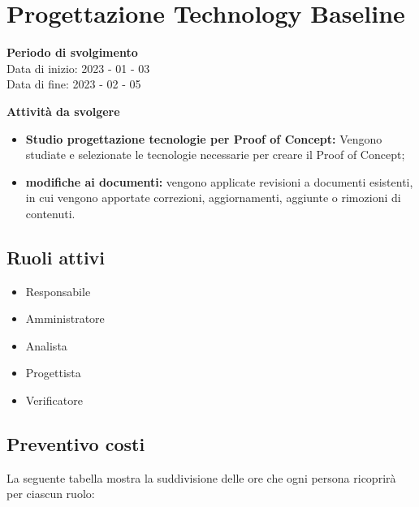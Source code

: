 \section{Progettazione Technology Baseline}

\textbf{Periodo di svolgimento}
\\ Data di inizio: 2023 - 01 - 03 \\ Data di fine: 2023 - 02 - 05

\textbf{Attività da svolgere}
    \begin{itemize}
        \item \textbf{Studio progettazione tecnologie per Proof of Concept:} Vengono studiate e selezionate le tecnologie necessarie per creare il Proof of Concept; 
        \item \textbf{modifiche ai documenti:} vengono applicate revisioni a documenti esistenti, in cui vengono apportate correzioni, aggiornamenti, aggiunte o rimozioni di contenuti.
    \end{itemize}

\subsection{Ruoli attivi}
\begin{itemize}
    \item Responsabile
    \item Amministratore 
    \item Analista 
    \item Progettista 
    \item Verificatore 
\end{itemize}

\subsection{Preventivo costi}

La seguente tabella mostra la suddivisione delle ore che ogni persona ricoprirà per ciascun ruolo:

